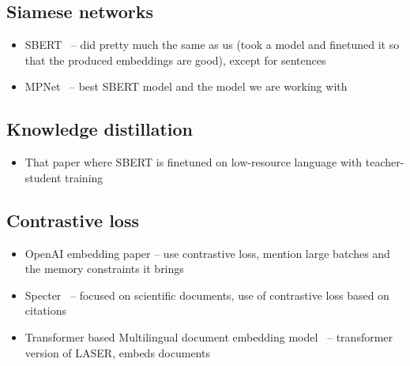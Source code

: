 \subsection{Siamese networks}


\begin{itemize}

      \item SBERT~\citep{reimers2019sentence} -- did pretty much the same as us
        (took a model and finetuned it so that the produced embeddings are good),
        except for sentences

      \item MPNet~\citep{song2020mpnet} -- best SBERT model and the model we are
        working with

\end{itemize}

\subsection{Knowledge distillation}

\begin{itemize}

      \item That paper where SBERT is finetuned on low-resource language with
          teacher-student training~\citep{reimers2020making}

\end{itemize}

\subsection{Contrastive loss}

\begin{itemize}

      \item OpenAI embedding paper -- use contrastive loss, mention large batches
        and the memory constraints it brings

      \item Specter~\citep{cohan2020specter} -- focused on scientific documents, use
        of contrastive loss based on citations

      \item Transformer based Multilingual document embedding
        model~\citep{li2020transformer} -- transformer version of LASER, embeds
        documents

\end{itemize}

